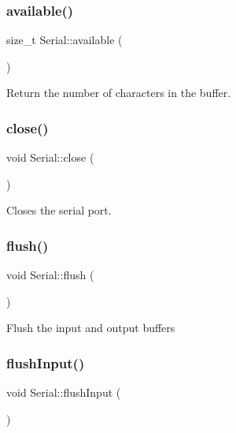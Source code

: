 \subsubsection{\texorpdfstring{available()}{available()}}
{\footnotesize\ttfamily size\+\_\+t Serial\+::available (\begin{DoxyParamCaption}{ }\end{DoxyParamCaption})}

Return the number of characters in the buffer. \mbox{\label{classserial_1_1_serial_afbe59407e718bc3d22ea4a67b304db6c}} 
\subsubsection{\texorpdfstring{close()}{close()}}
{\footnotesize\ttfamily void Serial\+::close (\begin{DoxyParamCaption}{ }\end{DoxyParamCaption})}

Closes the serial port. \mbox{\label{classserial_1_1_serial_a63b7abf172cad25bfc998b3b1f98310f}} 
\subsubsection{\texorpdfstring{flush()}{flush()}}
{\footnotesize\ttfamily void Serial\+::flush (\begin{DoxyParamCaption}{ }\end{DoxyParamCaption})}

Flush the input and output buffers \mbox{\label{classserial_1_1_serial_afa2c1f9114a37b7d140fc2292d1499b9}} 
\subsubsection{\texorpdfstring{flush\+Input()}{flushInput()}}
{\footnotesize\ttfamily void Serial\+::flush\+Input (\begin{DoxyParamCaption}{ }\end{DoxyParamCaption})}


